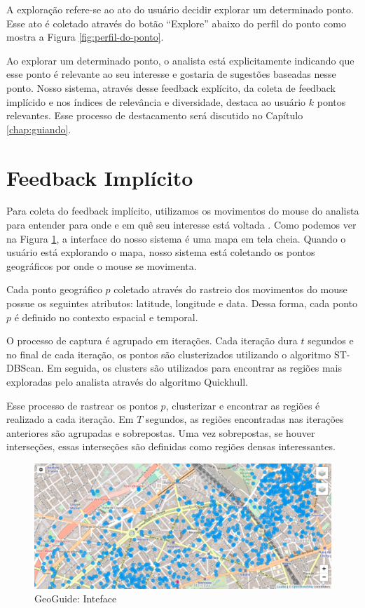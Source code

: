 A exploração refere-se ao ato do usuário decidir explorar um determinado ponto. Esse ato é coletado através do botão ``Explore'' abaixo do perfil do ponto como mostra a Figura \ref{fig:perfil-do-ponto}.

Ao explorar um determinado ponto, o analista está explicitamente indicando que esse ponto é relevante ao seu interesse e gostaria de sugestões baseadas nesse ponto. Nosso sistema, através desse feedback explícito, da coleta de feedback implícido e nos índices de relevância e diversidade, destaca ao usuário $k$ pontos relevantes. Esse processo de destacamento será discutido no Capítulo \ref{chap:guiando}.

\section{Feedback Implícito}

Para coleta do feedback implícito, utilizamos os movimentos do mouse do analista para entender para onde e em quê seu interesse está voltada \cite{arapakis2014understanding}. Como podemos ver na Figura \ref{fig:interface}, a interface do nosso sistema é uma mapa em tela cheia. Quando o usuário está explorando o mapa, nosso sistema está coletando os pontos geográficos por onde o mouse se movimenta.

Cada ponto geográfico $p$ coletado através do rastreio dos movimentos do mouse possue os seguintes atributos: latitude, longitude e data. Dessa forma, cada ponto $p$ é definido no contexto espacial e temporal.

O processo de captura é agrupado em iterações. Cada iteração dura $t$ segundos e no final de cada iteração, os pontos são clusterizados utilizando o algoritmo ST-DBScan. Em seguida, os clusters são utilizados para encontrar as regiões mais exploradas pelo analista através do algoritmo Quickhull.

Esse processo de rastrear os pontos $p$, clusterizar e encontrar as regiões é realizado a cada iteração. Em $T$ segundos, as regiões encontradas nas iterações anteriores são agrupadas e sobrepostas. Uma vez sobrepostas, se houver interseções, essas interseções são definidas como regiões densas interessantes.







\begin{figure}[t]
	\centering
	\includegraphics[width=\columnwidth]{imagens/interface}
	\caption{GeoGuide: Inteface}
	\label{fig:interface}
	\vspace{-10pt}
\end{figure}